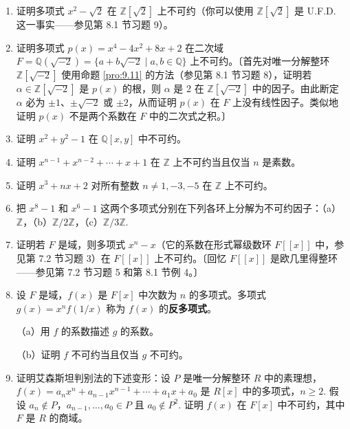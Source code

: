 \begin{enumerate}
\item 证明多项式 \(x^2-\sqrt{2}\) 在 \(\mathbb{Z}[\sqrt{2}]\) 上不可约（你可以使用 \(\mathbb{Z}[\sqrt{2}]\) 是 U.F.D. 这一事实——参见第 8.1 节习题 9）。

\item 证明多项式 \(p(x) = x^4-4x^2+8x+2\) 在二次域 \(F = \mathbb{Q}(\sqrt{-2}) = \{a+b\sqrt{-2} \mid a, b \in \mathbb{Q}\}\) 上不可约。〔首先对唯一分解整环 \(\mathbb{Z}[\sqrt{-2}]\) 使用命题 \ref{pro:9.11} 的方法（参见第 8.1 节习题 8），证明若 \(\alpha \in \mathbb{Z}[\sqrt{-2}]\) 是 \(p(x)\) 的根，则 \(\alpha\) 是 2 在 \(\mathbb{Z}[\sqrt{-2}]\) 中的因子。由此断定 \(\alpha\) 必为 \(\pm 1\)、\(\pm\sqrt{-2}\) 或 \(\pm 2\)，从而证明 \(p(x)\) 在 \(F\) 上没有线性因子。类似地证明 \(p(x)\) 不是两个系数在 \(F\) 中的二次式之积。〕

\item 证明 \(x^2+y^2-1\) 在 \(\mathbb{Q}[x, y]\) 中不可约。

\item 证明 \(x^{n-1}+x^{n-2}+\cdots+x+1\) 在 \(\mathbb{Z}\) 上不可约当且仅当 \(n\) 是素数。

\item 证明 \(x^3+nx+2\) 对所有整数 \(n \neq 1, -3, -5\) 在 \(\mathbb{Z}\) 上不可约。

\item 把 \(x^8-1\) 和 \(x^6-1\) 这两个多项式分别在下列各环上分解为不可约因子：（a）\(\mathbb{Z}\)，（b）\(\mathbb{Z}/2\mathbb{Z}\)，（c）\(\mathbb{Z}/3\mathbb{Z}\).

\item 证明若 \(F\) 是域，则多项式 \(x^n-x\)（它的系数在形式幂级数环 \(F[[x]]\) 中，参见第 7.2 节习题 3）在 \(F[[x]]\) 上不可约。〔回忆 \(F[[x]]\) 是欧几里得整环——参见第 7.2 节习题 5 和第 8.1 节例 4。〕

\item 设 \(F\) 是域，\(f(x)\) 是 \(F[x]\) 中次数为 \(n\) 的多项式。多项式 \(g(x) = x^nf(1/x)\) 称为 \(f(x)\) 的\textbf{反多项式}。

（a）用 \(f\) 的系数描述 \(g\) 的系数。

（b）证明 \(f\) 不可约当且仅当 \(g\) 不可约。

\item 证明艾森斯坦判别法的下述变形：设 \(P\) 是唯一分解整环 \(R\) 中的素理想，\(f(x) = a_nx^n + a_{n-1}x^{n-1} + \cdots + a_1x + a_0\) 是 \(R[x]\) 中的多项式，\(n \geq 2\). 假设 \(a_n \notin P\)，\(a_{n-1}, \ldots, a_0 \in P\) 且 \(a_0 \notin P^2\). 证明 \(f(x)\) 在 \(F[x]\) 中不可约，其中 \(F\) 是 \(R\) 的商域。


\end{enumerate}
